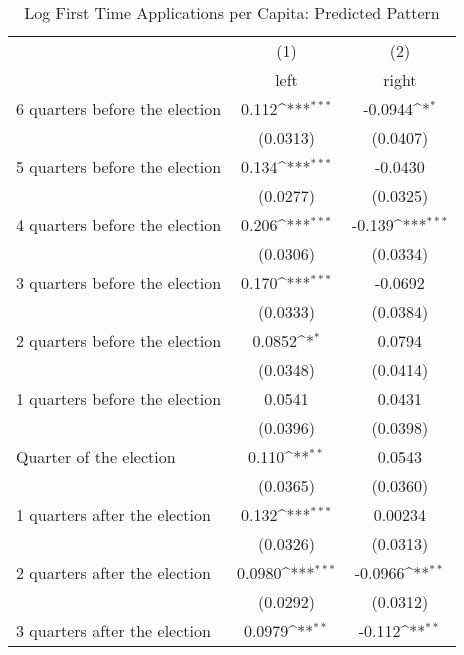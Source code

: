 \begin{table}[htbp]\centering
\def\sym#1{\ifmmode^{#1}\else\(^{#1}\)\fi}
\caption{Log First Time Applications per Capita: Predicted Pattern}
\begin{tabular}{l*{2}{c}}
\hline\hline
                    &\multicolumn{1}{c}{(1)}&\multicolumn{1}{c}{(2)}\\
                    &\multicolumn{1}{c}{left}&\multicolumn{1}{c}{right}\\
\hline
 6 quarters before the election&       0.112\sym{***}&     -0.0944\sym{*}  \\
                    &    (0.0313)         &    (0.0407)         \\
[1em]
 5 quarters before the election&       0.134\sym{***}&     -0.0430         \\
                    &    (0.0277)         &    (0.0325)         \\
[1em]
 4 quarters before the election&       0.206\sym{***}&      -0.139\sym{***}\\
                    &    (0.0306)         &    (0.0334)         \\
[1em]
 3 quarters before the election&       0.170\sym{***}&     -0.0692         \\
                    &    (0.0333)         &    (0.0384)         \\
[1em]
 2 quarters before the election&      0.0852\sym{*}  &      0.0794         \\
                    &    (0.0348)         &    (0.0414)         \\
[1em]
 1 quarters before the election&      0.0541         &      0.0431         \\
                    &    (0.0396)         &    (0.0398)         \\
[1em]
Quarter of the election&       0.110\sym{**} &      0.0543         \\
                    &    (0.0365)         &    (0.0360)         \\
[1em]
 1 quarters after the election&       0.132\sym{***}&     0.00234         \\
                    &    (0.0326)         &    (0.0313)         \\
[1em]
 2 quarters after the election&      0.0980\sym{***}&     -0.0966\sym{**} \\
                    &    (0.0292)         &    (0.0312)         \\
[1em]
 3 quarters after the election&      0.0979\sym{**} &      -0.112\sym{**} \\

\end{tabular}
\end{table}
